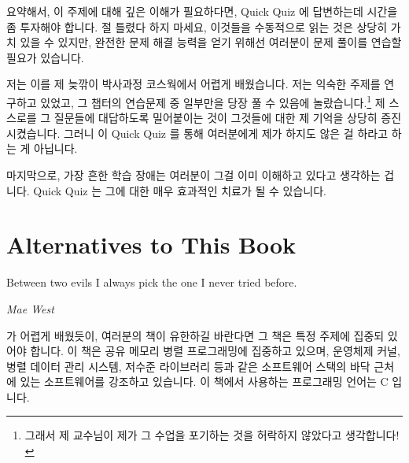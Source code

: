 요약해서, 이 주제에 대해 깊은 이해가 필요하다면, Quick Quiz 에 답변하는데
시간을 좀 투자해야 합니다.
절 틀렸다 하지 마세요, 이것들을 수동적으로 읽는 것은 상당히 가치 있을 수
있지만, 완전한 문제 해결 능력을 얻기 위해선 여러분이 문제 풀이를 연습할 필요가
있습니다.

저는 이를 제 늦깎이 박사과정 코스웍에서 어렵게 배웠습니다.
저는 익숙한 주제를 연구하고 있었고, 그 챕터의 연습문제 중 일부만을 당장 풀 수
있음에 놀랐습니다.\footnote{
	그래서 제 교수님이 제가 그 수업을 포기하는 것을 허락하지 않았다고
	생각합니다!}
제 스스로를 그 질문들에 대답하도록 밀어붙이는 것이 그것들에 대한 제 기억을
상당히 증진시켰습니다.
그러니 이 Quick Quiz 를 통해 여러분에게 제가 하지도 않은 걸 하라고 하는 게
아닙니다.

마지막으로, 가장 흔한 학습 장애는 여러분이 그걸 이미 이해하고 있다고 생각하는
겁니다.
Quick Quiz 는 그에 대한 매우 효과적인 치료가 될 수 있습니다.

\iffalse

In short, if you need a deep
understanding of the material, then you should invest some time
into answering the Quick Quizzes.
Don't get me wrong, passively reading the material can be quite
valuable, but gaining full problem-solving capability really
does require that you practice solving problems.

I learned this the hard way during coursework for my late-in-life
Ph.D\@.
I was studying a familiar topic, and was surprised at how few of
the chapter's exercises I could answer off the top of my head.\footnote{
	So I suppose that it was just as well that my professors refused
	to let me waive that class!}
Forcing myself to answer the questions greatly increased my
retention of the material.
So with these Quick Quizzes I am not asking you to do anything
that I have not been doing myself.

Finally, the most common learning disability is thinking that
you already understand the material at hand.
The quick quizzes can be an extremely effective cure.

\fi

\section{Alternatives to This Book}
\label{sec:Alternatives to This Book}
%
\epigraph{Between two evils I always pick the one I never tried before.}
	 {\emph{Mae West}}

 가 어렵게 배웠듯이, 여러분의 책이 유한하길 바란다면
그 책은 특정 주제에 집중되 있어야 합니다.
이 책은 공유 메모리 병렬 프로그래밍에 집중하고 있으며, 운영체제 커널, 병렬
데이터 관리 시스템, 저수준 라이브러리 등과 같은 소프트웨어 스택의 바닥 근처에
있는 소프트웨어를 강조하고 있습니다.
이 책에서 사용하는 프로그래밍 언어는 C 입니다.

